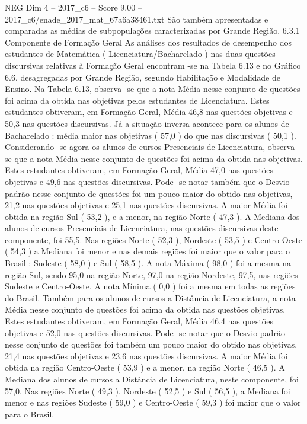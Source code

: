 \begin{textsample}{NEG Dim 4 – 2017\_c6 – Score 9.00 – 2017\_c6/enade\_2017\_mat\_67a6a38461.txt}
São também apresentadas e comparadas as médias de subpopulações caracterizadas por Grande Região. 6.3.1 Componente de Formação Geral As análises dos resultados de desempenho dos estudantes de Matemática ( Licenciatura/Bacharelado ) nas duas questões discursivas relativas à Formação Geral encontram -se na Tabela 6.13 e no Gráfico 6.6, desagregadas por Grande Região, segundo Habilitação e Modalidade de Ensino.
Na Tabela 6.13, observa -se que a nota Média nesse conjunto de questões foi acima da obtida nas objetivas pelos estudantes de Licenciatura.
Estes estudantes obtiveram, em Formação Geral, Média 46,8 nas questões objetivas e 50,3 nas questões discursivas.
Já a situação inversa acontece para os alunos de Bacharelado : média maior nas objetivas ( 57,0 ) do que nas discursivas ( 50,1 ).
Considerando -se agora os alunos de cursos Presenciais de Licenciatura, observa -se que a nota Média nesse conjunto de questões foi acima da obtida nas objetivas.
Estes estudantes obtiveram, em Formação Geral, Média 47,0 nas questões objetivas e 49,6 nas questões discursivas.
Pode -se notar também que o Desvio padrão nesse conjunto de questões foi um pouco maior do obtido nas objetivas, 21,2 nas questões objetivas e 25,1 nas questões discursivas.
A maior Média foi obtida na região Sul ( 53,2 ), e a menor, na região Norte ( 47,3 ).
A Mediana dos alunos de cursos Presenciais de Licenciatura, nas questões discursivas deste componente, foi 55,5.
Nas regiões Norte ( 52,3 ), Nordeste ( 53,5 ) e Centro-Oeste ( 54,3 ) a Mediana foi menor e nas demais regiões foi maior que o valor para o Brasil : Sudeste ( 58,0 ) e Sul ( 58,5 ).
A nota Máxima ( 98,0 ) foi a mesma na região Sul, sendo 95,0 na região Norte, 97,0 na região Nordeste, 97,5, nas regiões Sudeste e Centro-Oeste.
A nota Mínima ( 0,0 ) foi a mesma em todas as regiões do Brasil.
Também para os alunos de cursos a Distância de Licenciatura, a nota Média nesse conjunto de questões foi acima da obtida nas questões objetivas.
Estes estudantes obtiveram, em Formação Geral, Média 46,4 nas questões objetivas e 52,0 nas questões discursivas.
Pode -se notar que o Desvio padrão nesse conjunto de questões foi também um pouco maior do obtido nas objetivas, 21,4 nas questões objetivas e 23,6 nas questões discursivas.
A maior Média foi obtida na região Centro-Oeste ( 53,9 ) e a menor, na região Norte ( 46,5 ).
A Mediana dos alunos de cursos a Distância de Licenciatura, neste componente, foi 57,0.
Nas regiões Norte ( 49,3 ), Nordeste ( 52,5 ) e Sul ( 56,5 ), a Mediana foi menor e nas regiões Sudeste ( 59,0 ) e Centro-Oeste ( 59,3 ) foi maior que o valor para o Brasil.

\end{textsample}
